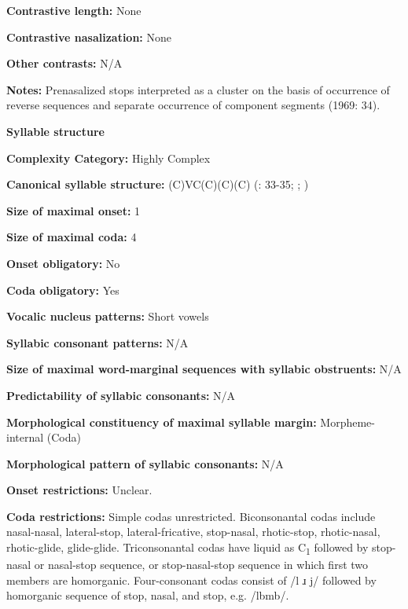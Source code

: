 \textbf{Contrastive length:} None



\textbf{Contrastive nasalization:} None



\textbf{Other contrasts:} N/A



\textbf{Notes:} Prenasalized stops interpreted as a cluster on the basis of occurrence of reverse sequences and separate occurrence of component segments (1969: 34).



\textbf{Syllable structure}



\textbf{Complexity Category:} Highly Complex



\textbf{Canonical syllable structure:} (C)VC(C)(C)(C) (\citealt{Sommer1969}: 33-35; \citealt{Sommer1981}; \citealt{Dixon1970})



\textbf{Size of maximal onset:} 1



\textbf{Size of maximal coda:} 4



\textbf{Onset obligatory:} No



\textbf{Coda obligatory:} Yes



\textbf{Vocalic nucleus patterns:} Short vowels



\textbf{Syllabic consonant patterns:} N/A



\textbf{Size of maximal word{}-marginal sequences with syllabic obstruents:} N/A



\textbf{Predictability of syllabic consonants:} N/A



\textbf{Morphological constituency of maximal syllable margin:} Morpheme-internal (Coda)



\textbf{Morphological pattern of syllabic consonants:} N/A



\textbf{Onset restrictions:} Unclear.



\textbf{Coda restrictions:} Simple codas unrestricted. Biconsonantal codas include nasal-nasal, lateral-stop, lateral-fricative, stop-nasal, rhotic-stop, rhotic-nasal, rhotic-glide, glide-glide. Triconsonantal codas have liquid as C\textsubscript{1} followed by stop-nasal or nasal-stop sequence, or stop-nasal-stop sequence in which first two members are homorganic. Four-consonant codas consist of /l ɹ j/ followed by homorganic sequence of stop, nasal, and stop, e.g. /lbmb/.




